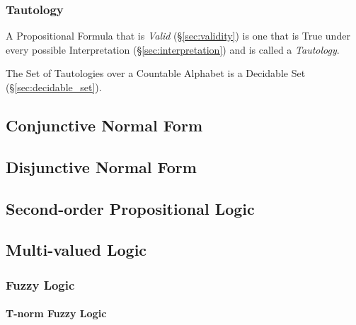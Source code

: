 \subsubsection{Tautology}\label{sec:tautology}

A Propositional Formula that is \emph{Valid} (\S\ref{sec:validity}) is
one that is True under every possible Interpretation
(\S\ref{sec:interpretation}) and is called a \emph{Tautology}.

The Set of Tautologies over a Countable Alphabet is a Decidable Set
(\S\ref{sec:decidable_set}).



\subsection{Conjunctive Normal Form}\label{sec:conjunctive_form}

\subsection{Disjunctive Normal Form}\label{sec:disjunctive_form}

\subsection{Second-order Propositional Logic}
\label{sec:secondorder_propositional_logic}

\subsection{Multi-valued Logic}\label{sec:multi_valued_logic}

\subsubsection{Fuzzy Logic}\label{sec:fuzzy_logic}

\paragraph{T-norm Fuzzy Logic}\label{sec:tnorm_logic}

